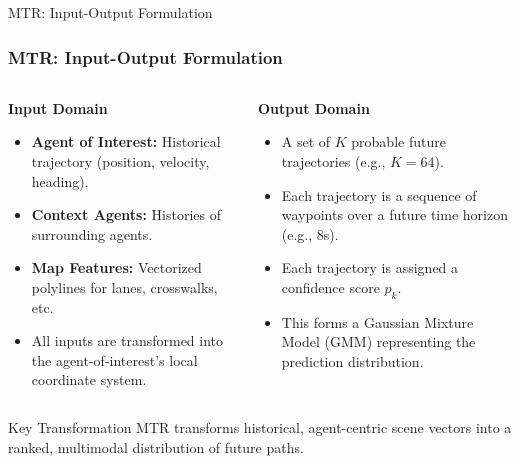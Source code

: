 \documentclass[10pt,aspectratio=169]{beamer}
\begin{document}
\begin{frame}{MTR: Input-Output Formulation}
    \frametitle{MTR: Input-Output Formulation}
    \begin{columns}[T]
        \begin{column}{0.5\textwidth}
            \textbf{Input Domain}
            \begin{itemize}
                \item \textbf{Agent of Interest:} Historical trajectory (position, velocity, heading).
                \item \textbf{Context Agents:} Histories of surrounding agents.
                \item \textbf{Map Features:} Vectorized polylines for lanes, crosswalks, etc.
                \item All inputs are transformed into the agent-of-interest's local coordinate system.
            \end{itemize}
        \end{column}
        \begin{column}{0.5\textwidth}
            \textbf{Output Domain}
            \begin{itemize}
                \item A set of $K$ probable future trajectories (e.g., $K=64$).
                \item Each trajectory is a sequence of waypoints over a future time horizon (e.g., 8s).
                \item Each trajectory is assigned a confidence score $p_k$.
                \item This forms a Gaussian Mixture Model (GMM) representing the prediction distribution.
            \end{itemize}
        \end{column}
    \end{columns}
    \vfill
    \begin{block}{Key Transformation}
        MTR transforms historical, agent-centric scene vectors into a ranked, multimodal distribution of future paths.
    \end{block}
\end{frame}
\end{document}
